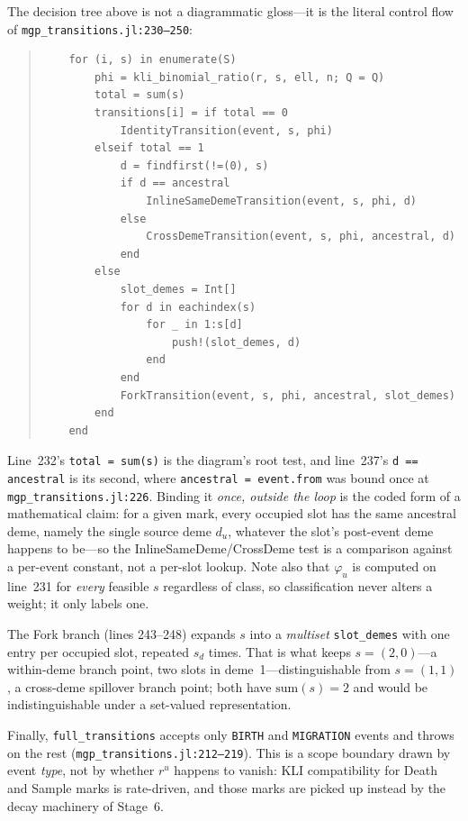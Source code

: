 \documentclass[11pt,leqno]{article}
\newcommand{\code}[1]{\texttt{#1}}
\theoremstyle{plain}
\theoremstyle{definition}
\begin{document}
The decision tree above is not a diagrammatic gloss---it is the literal
control flow of \code{mgp\_transitions.jl:230--250}:
\begin{quote}
{\small
\begin{verbatim}
    for (i, s) in enumerate(S)
        phi = kli_binomial_ratio(r, s, ell, n; Q = Q)
        total = sum(s)
        transitions[i] = if total == 0
            IdentityTransition(event, s, phi)
        elseif total == 1
            d = findfirst(!=(0), s)
            if d == ancestral
                InlineSameDemeTransition(event, s, phi, d)
            else
                CrossDemeTransition(event, s, phi, ancestral, d)
            end
        else
            slot_demes = Int[]
            for d in eachindex(s)
                for _ in 1:s[d]
                    push!(slot_demes, d)
                end
            end
            ForkTransition(event, s, phi, ancestral, slot_demes)
        end
    end
\end{verbatim}
}
\end{quote}
Line~232's \code{total = sum(s)} is the diagram's root test, and line~237's
\code{d == ancestral} is its second, where \code{ancestral = event.from} was
bound once at \code{mgp\_transitions.jl:226}.  Binding it \emph{once, outside
the loop} is the coded form of a mathematical claim: for a given mark, every
occupied slot has the same ancestral deme, namely the single source deme
$d_u$, whatever the slot's post-event deme happens to be---so the
InlineSameDeme/CrossDeme test is a comparison against a per-event constant,
not a per-slot lookup.  Note also that $\varphi_u$ is computed on line~231
for \emph{every} feasible $s$ regardless of class, so classification never
alters a weight; it only labels one.

The Fork branch (lines 243--248) expands $s$ into a \emph{multiset}
\code{slot\_demes} with one entry per occupied slot, repeated $s_d$ times.
That is what keeps $s=(2,0)$---a within-deme branch point, two slots in
deme~1---distinguishable from $s=(1,1)$, a cross-deme spillover branch point;
both have $\mathrm{sum}(s)=2$ and would be indistinguishable under a
set-valued representation.

Finally, \code{full\_transitions} accepts only \code{BIRTH} and
\code{MIGRATION} events and throws on the rest
(\code{mgp\_transitions.jl:212--219}).  This is a scope boundary drawn by
event \emph{type}, not by whether $r^u$ happens to vanish: KLI compatibility
for Death and Sample marks is rate-driven, and those marks are picked up
instead by the decay machinery of Stage~6.
\end{document}
